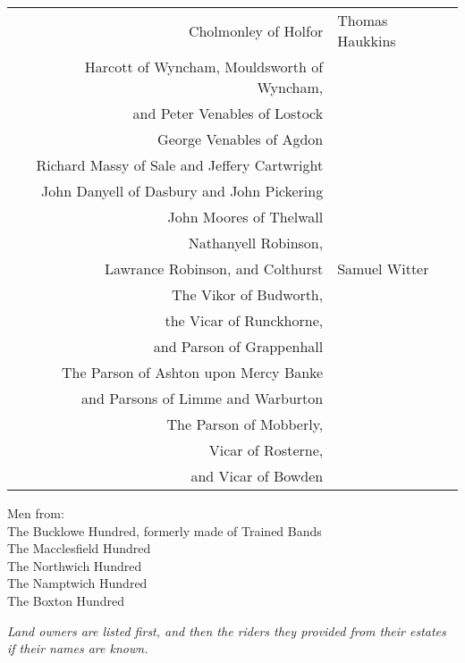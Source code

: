 \begin{center}
\begin{tabular}{rl}
    Cholmonley of Holfor & Thomas Haukkins \\
    Harcott of Wyncham, Mouldsworth of Wyncham, \\ and Peter Venables of Lostock & \\
    George Venables of Agdon & \dotfill \\
    Richard Massy of Sale and Jeffery Cartwright & \dotfill \\
    John Danyell of Dasbury and John Pickering & \dotfill \\
    John Moores of Thelwall & \dotfill \\
    Nathanyell Robinson, \\ Lawrance Robinson, and Colthurst & Samuel Witter \\
    The Vikor of Budworth, \\ the Vicar of Runckhorne, \\ and Parson of Grappenhall & \dotfill \\
    The Parson of Ashton upon Mercy Banke \\ and Parsons of Limme and Warburton & \dotfill \\
    The Parson of Mobberly, \\ Vicar of Rosterne, \\ and Vicar of Bowden & \dotfill \\
  \end{tabular}
\end{center}

{
  \scriptsize
  \noindent Men from: \\
  \vin The Bucklowe Hundred, formerly made of Trained Bands \\
  \vin The Macclesfield Hundred \\
  \vin The Northwich Hundred \\
  \vin The Namptwich Hundred \\
  \vin The Boxton Hundred
}

\vfill

\begin{center}
  \noindent
  \it
  \small
  Land owners are listed first, and then the riders they provided from their estates if their names are known.
\end{center}
